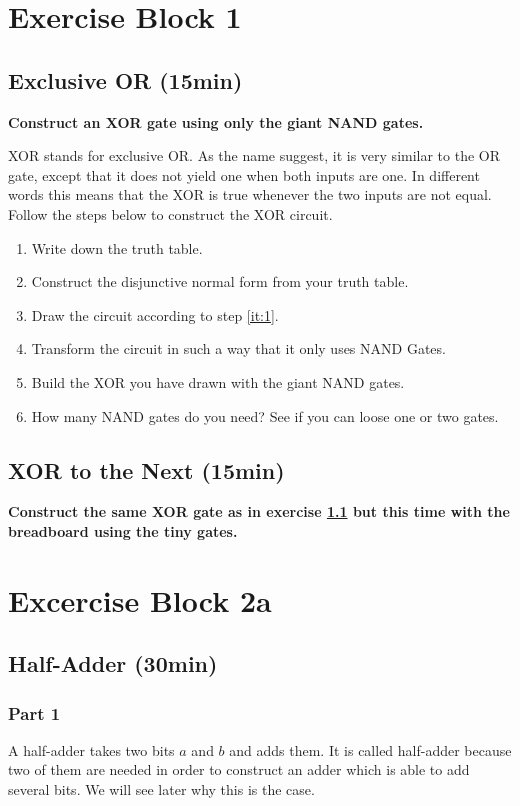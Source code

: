 \newpage
\section{Exercise Block 1}
\label{sec:exercise-block-1}

\subsection{Exclusive OR (15min)}\label{subsec:ex-1}
\textbf{Construct an XOR gate using only the giant NAND gates.}

 XOR stands for exclusive OR. As the name suggest, it is very similar to the OR gate, except that it does not yield one when both inputs are one. In different words this means that the XOR is true whenever the two inputs are not equal. Follow the steps below to construct the XOR circuit.
\begin{enumerate}
	\item Write down the truth table.
	\item\label{it:1} Construct the disjunctive normal form from your truth table.
	\item Draw the circuit according to step \ref{it:1}.
	\item Transform the circuit in such a way that it only uses NAND Gates.
	\item Build the XOR you have drawn with the giant NAND gates.
	\item How many NAND gates do you need? See if you can loose one or two gates.
\end{enumerate}

\subsection{XOR to the Next (15min)}
\textbf{Construct the same XOR gate as in exercise \ref{subsec:ex-1} but this time with the breadboard using the tiny gates.}


\section{Excercise Block 2a}

\subsection{Half-Adder (30min)}
\subsubsection{Part 1}
A half-adder takes two bits $a$ and $b$ and adds them. It is called half-adder because two of them are needed in order to construct an adder which is able to add several bits. We will see later why this is the case.

